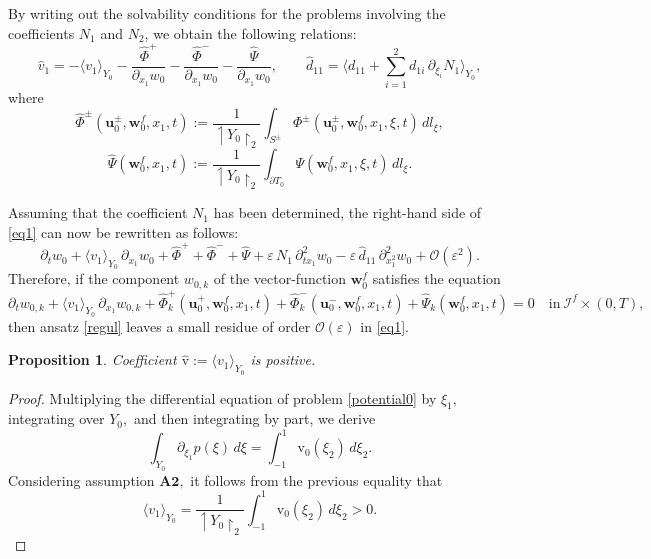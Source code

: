 \documentclass[reqno]{amsart}            %
\newtheorem{proposition}{Proposition}[section]
\numberwithin{equation}{section}
\begin{document}
	By writing out the solvability conditions for the problems involving the coefficients $N_1$ and $N_2$, we obtain the following relations:
	\begin{equation*}%
		\widehat{v}_1 = - \langle v_1 \rangle_{Y_0} - \frac{\widehat{\Phi}^+}{\partial_{x_1}w_0}  - \frac{\widehat{\Phi}^-}{\partial_{x_1}w_0} - \frac{\widehat{\Psi}}{\partial_{x_1}w_0},
	\qquad 	\widehat{d}_{11} = \Big\langle d_{11} + \sum_{i=1}^{2} d_{1 i}\, \partial_{\xi_i}N_1\Big\rangle_{Y_0},
	\end{equation*}
	where
	\begin{equation}\label{eq10}
		\widehat{\Phi}^\pm(\mathbf{u}^\pm_0, \mathbf{w}^f_0, x_1, t) := \frac{1}{\upharpoonleft\!\! Y_0 \!\!\upharpoonright_2} \int_{S^\pm} \Phi^\pm(\mathbf{u}^\pm_0, \mathbf{w}^f_0, x_1, \xi, t)\, dl_\xi,
	\end{equation}
	\begin{equation}\label{eq11}
		\widehat{\Psi}(\mathbf{w}^f_0, x_1, t) := \frac{1}{\upharpoonleft\!\! Y_0 \!\!\upharpoonright_2} \int_{\partial T_0} \Psi(\mathbf{w}^f_0, x_1, \xi, t)\, dl_\xi.
	\end{equation}
	
	Assuming that the coefficient $N_1$ has been determined, the right-hand side of \eqref{eq1} can now be rewritten as follows:
	\begin{equation}\label{eq12}
		\partial_t w_0 +  \langle v_1 \rangle_{Y_0} \, \partial_{x_1} w_0 +  \widehat{\Phi}^+
		+ \widehat{\Phi}^- + \widehat{\Psi} + \varepsilon\, N_1\, \partial^2_{t x_1}w_0 
		- \varepsilon\, \widehat{d}_{11} \, \partial^2_{x^2_1} w_0 + \mathcal{O}(\varepsilon^2).
	\end{equation}
	Therefore, if the component $w_{0,k}$ of the vector-function $\mathbf{w}^f_0$ satisfies the equation
	\begin{equation}\label{eq13}
		\partial_t w_{0,k} 
		+ \langle v_1 \rangle_{Y_0} \, \partial_{x_1} w_{0,k} +  \widehat{\Phi}^+_k(\mathbf{u}^+_0, \mathbf{w}^f_0, x_1, t)
		+ \widehat{\Phi}^-_k(\mathbf{u}^-_0, \mathbf{w}^f_0, x_1, t) + \widehat{\Psi}_k(\mathbf{w}^f_0, x_1, t) = 0 \quad \text{in} \ \mathcal{I}^f\times (0,T),
	\end{equation}
	then ansatz \eqref{regul} leaves a small residue of order $\mathcal{O}(\varepsilon)$ in \eqref{eq1}. 
	
	\begin{proposition}\label{Prop-4-2}
		Coefficient $\hat{\mathrm{v}} := \langle v_1 \rangle_{Y_0}$ is positive.
	\end{proposition}
	\begin{proof}
		Multiplying the differential equation of problem \eqref{potential0} by  $\xi_1,$  integrating over $Y_0,$ and then integrating  by part, we derive  
		$$
		\int_{Y_0} \partial_{\xi_1}p(\xi)\,d\xi = \int_{-1}^{1} \mathrm{v}_0(\xi_2)\, d\xi_2.
		$$
		Considering assumption $\mathbf{A2},$ it follows from the previous equality that
		\begin{equation}\label{avarage conv flow}
			\langle v_1 \rangle_{Y_0} = \frac{1}{\upharpoonleft\!\! Y_0 \!\!\upharpoonright_2}\int_{-1}^{1} \mathrm{v}_0(\xi_2)\, d\xi_2 > 0.
		\end{equation}
	\end{proof}
	
\end{document}
